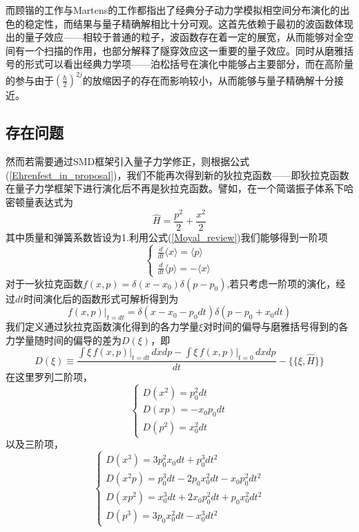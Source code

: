 而顾锴的工作与Martens的工作都指出了经典分子动力学模拟相空间分布演化的出色的稳定性，而结果与量子精确解相比十分可观\cite{kaiguPSQHD,donoso2000simulation}。这首先依赖于最初的波函数体现出的量子效应——相较于普通的粒子，波函数存在着一定的展宽，从而能够对全空间有一个扫描的作用，也部分解释了隧穿效应这一重要的量子效应。同时从磨雅括号的形式可以看出经典力学项——泊松括号在演化中能够占主要部分，而在高阶量的参与由于$\left(\frac{\hbar}{2}\right)^{2j}$的放缩因子的存在而影响较小，从而能够与量子精确解十分接近。
\subsection{存在问题}
然而若需要通过SMD框架引入量子力学修正，则根据公式(\ref{Ehrenfest_in_proposal})，我们不能再次得到新的狄拉克函数——即狄拉克函数在量子力学框架下进行演化后不再是狄拉克函数。譬如，在一个简谐振子体系下哈密顿量表达式为
\begin{equation}
	\hat{H} = \frac{p^2}{2} + \frac{x^2}{2}
\end{equation}
其中质量和弹簧系数皆设为1.利用公式(\ref{Moyal_review})我们能够得到一阶项
\begin{equation}
	\begin{cases}
	\frac{d }{dt}\langle x \rangle = \langle p \rangle \\
	\frac{d }{dt}\langle p \rangle = - \langle x \rangle
	\end{cases}
\end{equation}
对于一狄拉克函数$f(x,p) = \delta(x-x_0)\delta(p-p_0)$,若只考虑一阶项的演化，经过$dt$时间演化后的函数形式可解析得到为
\begin{equation}
f(x,p) \big|_{t=dt} = \delta(x-x_0 - p_0dt) \delta(p-p_0+x_0dt)
\end{equation}
我们定义通过狄拉克函数演化得到的各力学量$\xi$对时间的偏导与磨雅括号得到的各力学量随时间的偏导的差为$D(\xi)$，即
\begin{equation}
	D(\xi) \equiv \frac{\int \xi \, f(x,p) \big|_{t=dt} \, dx dp - \int \xi \, f(x,p) \big|_{t=0} \, dx dp }{dt} - \{\{\xi,\hat{H}\}\}
\end{equation}
在这里罗列二阶项，
\begin{equation}
	\begin{cases}
		D(x^2) = p_0^2 dt \\
		D(x p) = - x_0 p_0 dt \\
		D(p^2) = x_0^2 dt
	\end{cases}
\end{equation}
以及三阶项，
\begin{equation}
	\begin{cases}
		D(x^3) = 3 p_0^2 x_0 dt + p_0^3 dt^2\\
		D(x^2 p) = p_0^3 dt - 2 p_0 x_0^2 dt - x_0p_0^2 dt^2\\
		D(x p^2) = x_0^3 dt + 2x_0 p_0^2 dt + p_0 x_0^2 dt^2 \\
		D(p^3) = 3 p_0 x_0^2 dt - x_0^3 dt^2
	\end{cases}
\end{equation}
